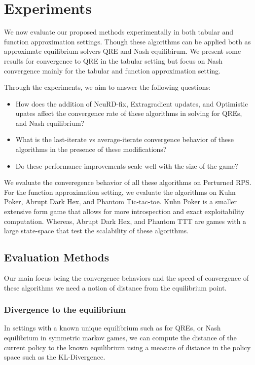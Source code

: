 \chapter{Experiments}

We now evaluate our proposed methods experimentally in both tabular and function approximation settings.
Though these algorithms can be applied both as approximate equilibrium solvers QRE and Nash equilibirum.
We present some results for convergence to QRE in the tabular setting but focus on Nash convergence mainly 
for the tabular and function approximation setting.

Through the experiments, we aim to answer the following questions:
\begin{itemize}
	\item How does the addition of NeuRD-fix, Extragradient updates, and Optimistic upates
	      affect the convergence rate of these algorithms in solving for QREs, and Nash equilibrium?
	\item What is the last-iterate vs average-iterate convergence behavior of these algorithms in the presence of these modifications?
	\item Do these performance improvements scale well with the size of the game?
\end{itemize}

We evaluate the converegence behavior of all these algorithms on Perturned RPS.
For the function approximation setting, we evaluate the algorithms on Kuhn Poker, Abrupt Dark Hex,
and Phantom Tic-tac-toe.
Kuhn Poker is a smaller extensive form game that allows for more introspection and exact exploitability computation.
Whereas, Abrupt Dark Hex, and Phantom TTT are games with a large state-space that test the scalability of these
algorithms.

\section{Evaluation Methods}
Our main focus being the convergence behaviors and the speed of convergence of these algorithms we need a notion of 
distance from the equilibrium point.

\subsection{Divergence to the equilibrium}
In settings with a known unique equilibrium such as for QREs, or Nash equilibrium in symmetric markov games, 
we can compute the distance of the current policy to the known equilibrium using a measure of distance in the policy space such as the KL-Divergence. 

